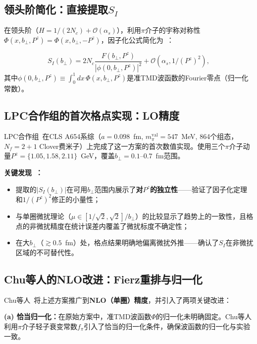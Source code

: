 \documentclass[12pt,a4paper]{ctexart}
\theoremstyle{definition}
\begin{document}
\subsection{领头阶简化：直接提取$S_I$}

在领头阶（$H = 1/(2N_c) + \mathcal{O}(\alpha_s)$），利用$\pi$介子的宇称对称性$\Phi(x, b_\perp, P^z) = \Phi(x, b_\perp, -P^z)$，因子化公式简化为~\cite{LPC2020soft}：

\begin{equation}
\boxed{S_I(b_\perp) = 2N_c \frac{F(b_\perp, P^z)}{|\phi(0, b_\perp, P^z)|^2} + \mathcal{O}(\alpha_s, 1/(P^z)^2)},
\label{eq:SI_LO_extraction}
\end{equation}
其中$\phi(0, b_\perp, P^z) \equiv \int_0^1 dx\, \Phi(x, b_\perp, P^z)$是准TMD波函数的Fourier零点（归一化常数）。

\subsection{LPC合作组的首次格点实现：LO精度}

LPC合作组~\cite{LPC2020soft}在CLS A654系综（$a = 0.098$~fm, $m_\pi^{\text{val}} = 547$~MeV, 864个组态，$N_f = 2+1$ Clover费米子）上完成了这一方案的首次数值实现。使用三个$\pi$介子动量$P^z = \{1.05, 1.58, 2.11\}$~GeV，覆盖$b_\perp = 0.1\text{--}0.7$~fm范围。

\textbf{关键发现~\cite{LPC2020soft}：}
\begin{itemize}[nosep]
    \item 提取的$|S_I(b_\perp)|$在可用$b_\perp$范围内展示了\textbf{对$P^z$的独立性}——验证了因子化定理和$1/(P^z)^2$修正的小量性；
    \item 与单圈微扰理论（$\mu \in [1/\sqrt{2}, \sqrt{2}]/b_\perp$）的比较显示了趋势上的一致性，且格点的非微扰精度在统计误差内覆盖了微扰标度不确定性；
    \item 在大$b_\perp$（$\gtrsim 0.5$~fm）处，格点结果明确地偏离微扰外推——确认了$S_I$在非微扰区域的不可替代性。
\end{itemize}

\subsection{Chu等人的NLO改进：Fierz重排与归一化}

Chu等人~\cite{Chu2023soft}将上述方案推广到\textbf{NLO（单圈）精度}，并引入了两项关键改进：

\textbf{(a) 恰当归一化：}在原始方案中，准TMD波函数$\Phi$的归一化未明确固定。Chu等人利用$\pi$介子轻子衰变常数$f_\pi$引入了恰当的归一化条件，确保波函数的归一化与实验一致。
\end{document}
